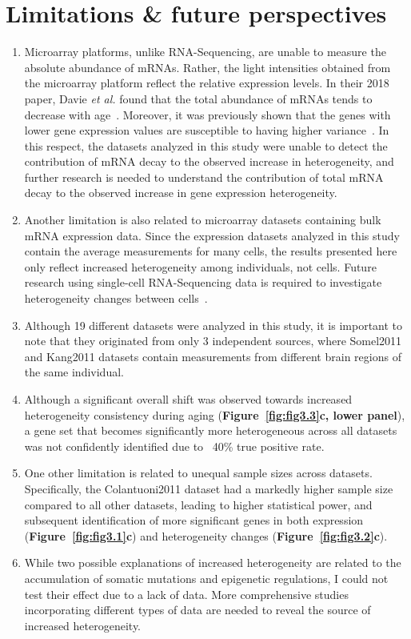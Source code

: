 \section{Limitations \& future perspectives}
\begin{enumerate}
    \item Microarray platforms, unlike RNA-Sequencing, are unable to measure the absolute abundance of mRNAs. 
    Rather, the light intensities obtained from the microarray platform reflect the relative expression levels.
    In their 2018 paper, Davie \textit{et al.} found that the total abundance of mRNAs tends to decrease with age~\autocite{Davie2018}.
    Moreover, it was previously shown that the genes with lower gene expression values are susceptible to having higher variance~\autocite{Aris2004}.
    In this respect, the datasets analyzed in this study were unable to detect the contribution of mRNA decay to the observed increase in heterogeneity, and
    further research is needed to understand the contribution of total mRNA decay to the observed increase in gene expression heterogeneity.
    
    \item Another limitation is also related to microarray datasets containing bulk mRNA expression data.
    Since the expression datasets analyzed in this study contain the average measurements for many cells,
    the results presented here only reflect increased heterogeneity among individuals, not cells.
    Future research using single-cell RNA-Sequencing data is required to investigate heterogeneity changes between cells~\autocite{Ximerakis2019}.
    \item Although 19 different datasets were analyzed in this study, it is important to note that they originated from only 3 independent sources,
    where Somel2011 and Kang2011 datasets contain measurements from different brain regions of the same individual.
    \item Although a significant overall shift was observed towards increased heterogeneity consistency during aging (\textbf{Figure~\ref{fig:fig3.3}c, lower panel}),
    a gene set that becomes significantly more heterogeneous across all datasets was not confidently identified due to ~40\% true positive rate.
    \item One other limitation is related to unequal sample sizes across datasets. 
    Specifically, the Colantuoni2011 dataset had a markedly higher sample size compared to all other datasets,
    leading to higher statistical power, and subsequent identification of more significant genes in both expression (\textbf{Figure~\ref{fig:fig3.1}c}) 
    and heterogeneity changes (\textbf{Figure~\ref{fig:fig3.2}c}).
    \item While two possible explanations of increased heterogeneity are related to the accumulation of somatic mutations and epigenetic regulations,
    I could not test their effect due to a lack of data. 
    More comprehensive studies incorporating different types of data are needed to reveal the source of increased heterogeneity.
\end{enumerate}
